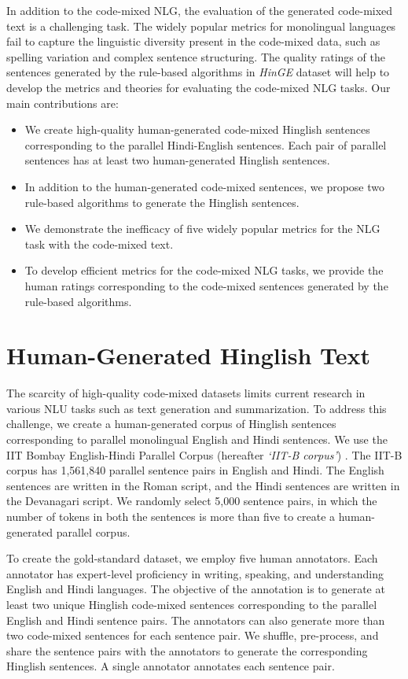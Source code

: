 \documentclass[11pt]{article}
\begin{document}
In addition to the code-mixed NLG, the evaluation of the generated code-mixed text is a challenging task. The widely popular metrics for monolingual languages fail to capture the linguistic diversity present in the code-mixed data, such as spelling variation and complex sentence structuring. The quality ratings of the sentences generated by the rule-based algorithms in \textit{HinGE} dataset will help to develop the metrics and theories for evaluating the code-mixed NLG tasks. 
Our main contributions are:
\begin{itemize}
    \item We create high-quality human-generated code-mixed Hinglish sentences corresponding to the parallel Hindi-English sentences. Each pair of parallel sentences has at least two human-generated Hinglish sentences.
    \item In addition to the human-generated code-mixed sentences, we propose two rule-based algorithms to generate the Hinglish sentences.
    \item We demonstrate the inefficacy of five widely popular metrics for the NLG task with the code-mixed text.
    \item To develop efficient metrics for the code-mixed NLG tasks, we provide the human ratings corresponding to the code-mixed sentences generated by the rule-based algorithms.
\end{itemize}

\section{Human-Generated Hinglish Text}
\label{sec:dataset}

The scarcity of high-quality code-mixed datasets limits current research in various NLU tasks such as text generation and summarization. To address this challenge, we create a human-generated corpus of Hinglish sentences corresponding to parallel monolingual English and Hindi sentences. We use the IIT Bombay English-Hindi Parallel Corpus (hereafter \textit{`IIT-B corpus'}) \cite{kunchukuttan2018iit}. The IIT-B corpus has 1,561,840 parallel sentence pairs in English and Hindi. The English sentences are written in the Roman script, and the Hindi sentences are written in the Devanagari script. We randomly select 5,000 sentence pairs, in which the number of tokens in both the sentences is more than five to create a human-generated parallel corpus.

To create the gold-standard dataset, we employ five human annotators. Each annotator has expert-level proficiency in writing, speaking, and understanding English and Hindi languages. The objective of the annotation is to generate at least two unique Hinglish code-mixed sentences corresponding to the parallel English and Hindi sentence pairs. The annotators can also generate more than two code-mixed sentences for each sentence pair. We shuffle, pre-process, and share the sentence pairs with the annotators to generate the corresponding Hinglish sentences. A single annotator annotates each sentence pair. 
\end{document}
